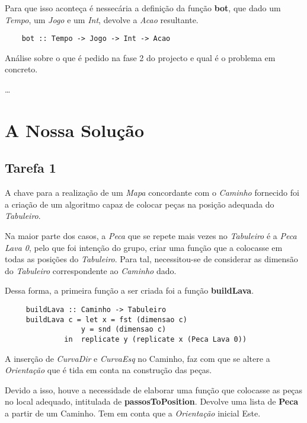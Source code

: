 \documentclass[a4paper]{report} %
\begin{document}
Para que isso aconteça é nessecária a definição da função \textbf{bot}, que dado um \emph{Tempo}, um \emph{Jogo} e um \emph{Int}, devolve a \emph{Acao} resultante.

\begin{verbatim} 
    bot :: Tempo -> Jogo -> Int -> Acao

\end{verbatim}

Análise sobre o que é pedido na fase 2 do projecto e qual é o problema em concreto.

\ldots


\chapter{A Nossa Solução}
\label{sec:solucao}

\section {Tarefa 1}
 A chave para a realização de um \emph{Mapa} concordante com o \emph{Caminho} fornecido foi a criação de um algoritmo capaz de colocar peças na posição adequada do \emph{Tabuleiro}.
 
 Na maior parte dos casos, a \emph{Peca} que se repete mais vezes no \emph{Tabuleiro} é a \emph{Peca Lava 0}, pelo que foi intenção do grupo, criar uma função que a colocasse em todas as posições do \emph{Tabuleiro}.
 Para tal, necessitou-se de considerar as dimensão do \emph{Tabuleiro} correspondente ao \emph{Caminho} dado.
 
 Dessa forma, a primeira função a ser criada foi a função \textbf{buildLava}.
 
 \begin{verbatim}
     buildLava :: Caminho -> Tabuleiro
     buildLava c = let x = fst (dimensao c)
                  y = snd (dimensao c)  
              in  replicate y (replicate x (Peca Lava 0))

 \end{verbatim}

A inserção de \emph{CurvaDir} e \emph{CurvaEsq} no Caminho, faz com que se altere a \emph{Orientação} que é tida em conta na construção das peças.

Devido a isso, houve a necessidade de elaborar uma função que colocasse as peças no local adequado, intitulada de \textbf{passosToPosition}. Devolve uma lista de \textbf{Peca} a partir de um Caminho. Tem em conta que a \emph{Orientação} inicial Este.
\end{document}
